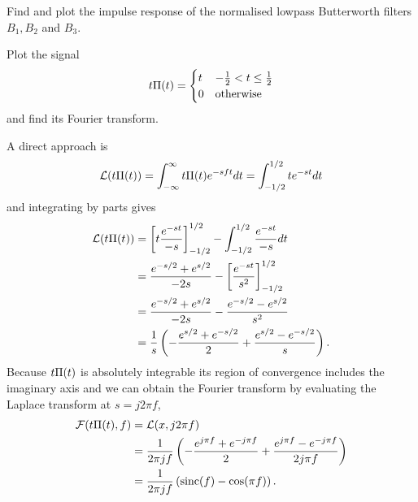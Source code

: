 \begin{excersizelist}
\item Find and plot the impulse response of the normalised lowpass Butterworth filters $B_1, B_2$ and $B_3$.

\item Plot the signal
\[
t\Pi(t) = \begin{cases}
t & -\tfrac{1}{2} < t \leq \tfrac{1}{2} \\
0 & \text{otherwise}
\end{cases}
\] 
and find its Fourier transform.
\begin{solution}
\begin{center}
\end{center}

A direct approach is
\[
\mathcal L( t \Pi(t) ) = \int_{-\infty}^\infty t \Pi(t) e^{-s f t} dt = \int_{-1/2}^{1/2} t e^{-s t} dt 
\]
and integrating by parts gives
\begin{align*}
\mathcal L( t \Pi(t) ) &= \left[ t \frac{e^{-s t}}{-s} \right]_{-1/2}^{1/2}  - \int_{-1/2}^{1/2} \frac{e^{-s t}}{-s}  dt \\
&= \frac{e^{-s/2} + e^{s/2}}{-2s} - \left[ \frac{e^{-st}}{s^2} \right]_{-1/2}^{1/2}  \\
&= \frac{e^{-s/2} + e^{s/2}}{-2s} - \frac{e^{-s/2} - e^{s/2}}{s^2}  \\
&= \frac{1}{s}\left( -\frac{e^{s/2} + e^{-s/2}}{2} + \frac{e^{s/2} - e^{-s/2}}{s} \right) .
\end{align*}
Because $t \Pi(t)$ is absolutely integrable its region of convergence includes the imaginary axis and we can obtain the Fourier transform by evaluating the Laplace transform at $s = j2\pi f$, 
\begin{align*}
{\mathcal F}( t \Pi(t), f) &= \mathcal L(x, j 2\pi f) \\
&= \frac{1}{2\pi j f}\left( -\frac{e^{j \pi f} + e^{-j\pi f}}{2} + \frac{e^{j\pi f} - e^{-j \pi f}}{2 j \pi f } \right) \\
&= \frac{1}{2\pi j f}\left( \operatorname{sinc}(f) - \cos(\pi f)\right) .
\end{align*}


\end{solution}
\end{excersizelist}

